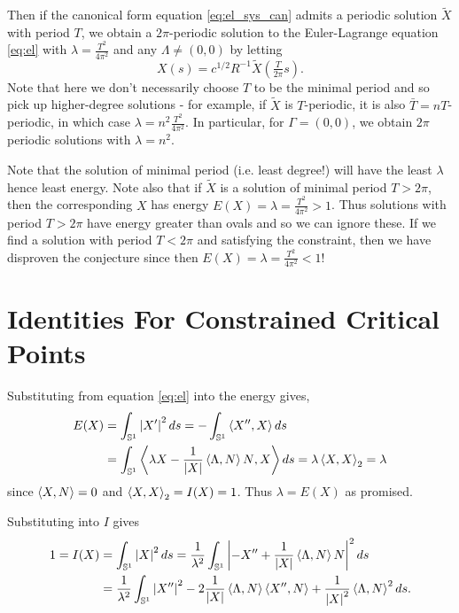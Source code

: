 \documentclass[12pt]{article}
\begin{document}
Then if the canonical form equation \eqref{eq:el_sys_can} admits a periodic solution \(\tilde{X}\) with period \(T\), we obtain a \(2\pi\)-periodic solution to the Euler-Lagrange equation \eqref{eq:el} with \(\lambda = \tfrac{T^2}{4\pi^2}\) and any \(\Lambda \ne (0, 0)\) by letting
\[
X(s) = c^{1/2} R^{-1} \tilde{X}\left(\tfrac{T}{2\pi}s\right).
\]
Note that here we don't necessarily choose \(T\) to be the minimal period and so pick up higher-degree solutions - for example, if \(\tilde{X}\) is \(T\)-periodic, it is also \(\bar{T} = nT\)-periodic, in which case \(\lambda = n^2 \tfrac{T^2}{4\pi^2}\). In particular, for \(\Gamma = (0, 0)\), we obtain \(2\pi\) periodic solutions with \(\lambda = n^2\).

\begin{rem}
Note that the solution of minimal period (i.e. least degree!) will have the least \(\lambda\) hence least energy. Note also that if \(\tilde{X}\) is a solution of minimal period \(T > 2\pi\), then the corresponding \(X\) has energy \(E(X) = \lambda = \tfrac{T^2}{4\pi^2} > 1\). Thus solutions with period \(T > 2\pi\) have energy greater than ovals and so we can ignore these. If we find a solution with period \(T < 2\pi\) and satisfying the constraint, then we have disproven the conjecture since then \(E(X) = \lambda = \tfrac{T^2}{4\pi^2} < 1\)!
\end{rem}

\section{Identities For Constrained Critical Points}

Substituting from equation \eqref{eq:el} into the energy gives,
\begin{equation}
\label{eq:Ecrit}
\begin{split}
E(X) &= \int_{\operatorname{\mathbb{S}^1}} \left|{X'}\right|^2 ds = -\int_{\operatorname{\mathbb{S}^1}} \left\langle{X''},{X}\right\rangle ds \\
&= \int_{\operatorname{\mathbb{S}^1}} \left\langle{\lambda X - \frac{1}{\left|{X}\right|} \ensuremath{\left\langle{\Lambda},{N}\right\rangle}N},{X}\right\rangle ds = \lambda \left\langle{X},{X}\right\rangle_2 = \lambda
\end{split}
\end{equation}
since \(\left\langle{X},{N}\right\rangle = 0\) and \(\left\langle{X},{X}\right\rangle_2 = I(X) = 1\). Thus \(\lambda = E(X)\) as promised.

Substituting into \(I\) gives
\begin{equation}
\label{eq:Icrit}
\begin{split}
1 = I(X) &= \int_{\operatorname{\mathbb{S}^1}} \left|{X}\right|^2 ds = \frac{1}{\lambda^2} \int_{\operatorname{\mathbb{S}^1}} \left|{-X'' +  \frac{1}{\left|{X}\right|} \left\langle{\Lambda},{N}\right\rangle N}\right|^2 ds \\
&= \frac{1}{\lambda^2} \int_{\operatorname{\mathbb{S}^1}} \left|{X''}\right|^2 - 2\frac{1}{\left|{X}\right|} \left\langle{\Lambda},{N}\right\rangle\left\langle{X''},{N}\right\rangle + \frac{1}{\left|{X}\right|^2} \left\langle{\Lambda},{N}\right\rangle^2 ds.
\end{split}
\end{equation}
\end{document}
